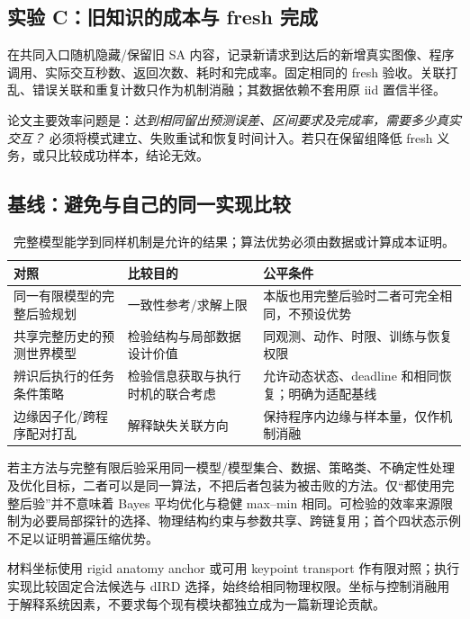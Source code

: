 \documentclass[11pt,a4paper,fontset=fandol]{ctexart}
\theoremstyle{definition}\newtheorem{definition}[theorem]{定义}
\theoremstyle{remark}\newtheorem{remark}[theorem]{说明}
\numberwithin{equation}{section}
\begin{document}
\subsection{实验 C：旧知识的成本与 fresh 完成}
在共同入口随机隐藏/保留旧 SA 内容，记录新请求到达后的新增真实图像、程序调用、实际交互秒数、返回次数、耗时和完成率。固定相同的 fresh 验收。关联打乱、错误关联和重复计数只作为机制消融；其数据依赖不套用原 iid 置信半径。

论文主要效率问题是：\emph{达到相同留出预测误差、区间要求及完成率，需要多少真实交互？} 必须将模式建立、失败重试和恢复时间计入。若只在保留组降低 fresh 义务，或只比较成功样本，结论无效。

\subsection{基线：避免与自己的同一实现比较}
\begin{table}[htbp]\centering\small
\begin{tabularx}{\linewidth}{P{.25\linewidth}YY}\toprule
对照 & 比较目的 & 公平条件\\\midrule
同一有限模型的完整后验规划 & 一致性参考/求解上限 & 本版也用完整后验时二者可完全相同，不预设优势\\
共享完整历史的预测世界模型 & 检验结构与局部数据设计价值 & 同观测、动作、时限、训练与恢复权限\\
辨识后执行的任务条件策略 & 检验信息获取与执行时机的联合考虑 & 允许动态状态、deadline 和相同恢复；明确为适配基线\\
边缘因子化/跨程序配对打乱 & 解释缺失关联方向 & 保持程序内边缘与样本量，仅作机制消融\\\bottomrule
\end{tabularx}
\caption{完整模型能学到同样机制是允许的结果；算法优势必须由数据或计算成本证明。}
\end{table}

若主方法与完整有限后验采用同一模型/模型集合、数据、策略类、不确定性处理及优化目标，二者可以是同一算法，不把后者包装为被击败的方法。仅“都使用完整后验”并不意味着 Bayes 平均优化与稳健 max--min 相同。可检验的效率来源限制为必要局部探针的选择、物理结构约束与参数共享、跨链复用；首个四状态示例不足以证明普遍压缩优势。

材料坐标使用 rigid anatomy anchor 或可用 keypoint transport 作有限对照；执行实现比较固定合法候选与 dIRD 选择，始终给相同物理权限。坐标与控制消融用于解释系统因素，不要求每个现有模块都独立成为一篇新理论贡献。
\end{document}
